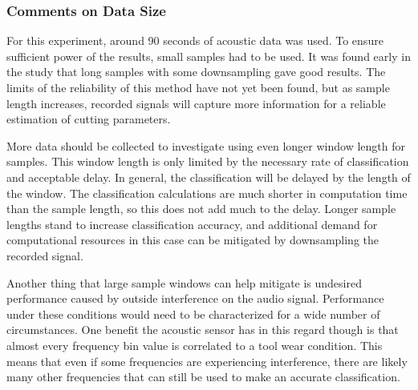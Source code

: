 \subsubsection{Comments on Data Size}

For this experiment, around 90 seconds of acoustic data was used. 
To ensure sufficient power of the results, small samples had to be used. 
It was found early in the study that long samples with some downsampling gave good results.
The limits of the reliability of this method have not yet been found, but as sample length increases,
recorded signals will capture more information for a reliable estimation of cutting parameters.

More data should be collected to investigate using even longer window length for samples.
This window length is only limited by the necessary rate of classification and acceptable delay.
In general, the classification will be delayed by the length of the window. 
The classification calculations are much shorter in computation time than the sample length, so this
does not add much to the delay.
Longer sample lengths stand to increase classification accuracy, and additional demand for computational
resources in this case can be mitigated by downsampling the recorded signal.

Another thing that large sample windows can help mitigate is undesired performance caused by outside interference
on the audio signal. Performance under these conditions would need to be characterized for a wide number of 
circumstances. One benefit the acoustic sensor has in this regard though is that almost every frequency
bin value is correlated to a tool wear condition. This means that even if some frequencies are
experiencing interference, there are likely many other frequencies that can still be used to make an accurate classification.

